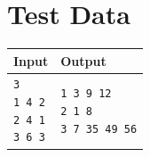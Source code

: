 \documentclass[11pt]{article}
\begin{document}
\section{Test Data}
\begin{tabularx}{\textwidth}{|X|X|}
	\hline
	Input & Output \\ \hline
	\parbox[t]{5cm}{
	\texttt{3\\
			1 4 2\\
			2 4 1\\
			3 6 3\\
	}} &
	\parbox[t]{5cm}{
	\texttt{1 3 9 12\\
			2 1 8\\
			3 7 35 49 56\\
			}}\\
	\hline
\end{tabularx}
\end{document}
